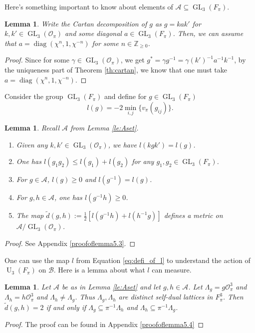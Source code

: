\documentclass{eptcs}
\newtheorem{lemma}[theorem]{Lemma}
\theoremstyle{remark}
\theoremstyle{definition}
\providecommand{\tightlist}{%
  \setlength{\itemsep}{0pt}\setlength{\parskip}{0pt}}
\DeclareMathOperator{\GL}{GL}
\DeclareMathOperator{\diag}{diag}
\DeclareMathOperator{\U}{U}
\begin{document}
Here's something important to know about elements of $\mathcal{A} \subseteq \GL_{3}(F_{\pi})$.
\begin{lemma}
  \label{le:diagonals}
    Write the Cartan decomposition of $g$ as $g = k a k'$ for $k,k' \in \GL_{3}(\mathcal{O}_{\pi})$ and some diagonal $a \in \GL_{3}(F_{\pi})$. Then, we can assume that $a = \diag(\chi^{n},1,\chi^{-n})$ for some $n \in \mathbb{Z}_{\geq 0}$.

\end{lemma}
\begin{proof}
    Since for some $\gamma \in \GL_{3}(\mathcal{O}_{\pi})$, we get $ g^{*} = \gamma g^{-1} =  \gamma (k')^{-1} a^{-1} k^{-1}$, by the uniqueness part of Theorem \ref{th:cartan}, we know that one must take $a= \diag(\chi^{n}, 1 , \chi^{-n})$.
\end{proof}


Consider the group 
$\GL_{3}(F_{\pi})$ and define for $g\in \GL_{3}(F_{\pi})$
\begin{equation}
    l(g) = -2 \min_{i,j}\{ v_\pi (g_{ij})\}.
    \label{eq:defi_of_l}
\end{equation}

\begin{lemma}
  \label{le:ispositive}
  Recall $\mathcal{A}$ from Lemma \ref{le:Aset}.
  \begin{enumerate}
\tightlist
  \item Given any $k, k' \in \GL_{3}(\mathcal{O}_{\pi})$, we have $l(kgk') = l(g)$.
      \item One has $l(g_{1}g_{2}) \leq l(g_{1}) + l(g_{2})$ for any $g_{1}, g_{2} \in \GL_{3}(F_{\pi})$.
	  \item For $g \in \mathcal{A}$, $l(g) \geq 0$ and $l(g^{-1}) = l(g)$.
	  \item For $g,h \in \mathcal{A}$, one has $l(g^{-1} h) \geq 0$. 
	      \item 
	      The map $\tilde{d}(g,h):= \frac{1}{2}[l(g^{-1}h) + l(h^{-1} g)]$ defines a metric on $  \mathcal{A} / \GL_{3}(\mathcal{O}_{\pi})$.
  \end{enumerate}
\end{lemma}
\begin{proof}
See Appendix \ref{proofoflemma5.3}.
\end{proof}



One can use the map $l$ from Equation \ref{eq:defi_of_l} to understand the action of $\U_{3}(F_{\pi})$ on $\mathcal{B}$. 
Here is a lemma about what $l$ can measure.
\begin{lemma}
  \label{le:hecke_nghbs}
  Let $\mathcal{A}$ be as in Lemma \ref{le:Aset} and let $g,h \in \mathcal{A}$.
  Let $\Lambda_{g} = g \mathcal{O}_{\pi}^{3}$ and $\Lambda_{h} = h \mathcal{O}_{\pi}^{3}$ and $\Lambda_{h} \neq \Lambda_{g}$. 
  Thus $\Lambda_{g},\Lambda_{h}$ are distinct self-dual lattices in $F_{\pi}^{3}$.
  Then $\tilde{d}(g,h) = 2$ if and only if $ \Lambda_{g }\subseteq  \pi^{-1}\Lambda_{h}$ and $ \Lambda_{h} \subseteq \pi^{-1} \Lambda_{g}$.
\end{lemma}
\begin{proof}
The proof can be found in Appendix \ref{proofoflemma5.4}
\end{proof}
\end{document}
